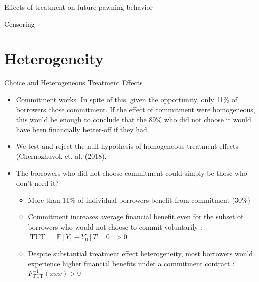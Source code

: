 \documentclass[8pt]{beamer}
\begin{document}
\begin{frame}{Effects of treatment on future pawning behavior}
    
\begin{table}[H]
\caption{Repeat Pawns}
\label{repeat_loans}
\begin{center}
\scriptsize{}
\end{center}

\end{table}    
\end{frame}

\begin{frame}{Censoring}
    \begin{table}[H]
\caption{Bounding censoring}
\label{bounding_censoring}
\begin{center}
\resizebox{0.9\textwidth}{!}{
\scriptsize{}
}
\end{center}
 \scriptsize 
\end{table}
\end{frame}

\section{Heterogeneity}
\begin{frame}{Choice and Heterogeneous Treatment Effects}
\label{choice_hte}
    \begin{itemize}
    \vfill    \item   Commitment works.   In spite of this, given the  opportunity,  only 11\%  of  borrowers  chose  commitment.   If  the  effect  of  commitment  were homogeneous, this would be enough to conclude that the 89\% who did not choose it would have been financially better-off if they had.
    
    \vfill \item We test and reject the null hypothesis of homogeneous treatment effects (Chernozhuvok et. al. (2018).
    
    \vfill \item The borrowers who did not choose commitment could simply be those who don’t need it?
    
    \begin{itemize}
        \item More than 11\% of individual borrowers benefit from commitment (30\%) \hyperlink{fan_park_bounds}{}
        \item Commitment increases average financial benefit even for the subset of borrowers who would not choose to commit voluntarily : $\operatorname{TUT}=\mathbb{E}[Y_1-Y_0\,|\, T=0]>0$
        \item Despite substantial treatment effect heterogeneity, most borrowers would experience higher financial benefits under a commitment contract : $F_{\operatorname{TUT}}^{-1}(xxx)>0$
    \end{itemize}
    \end{itemize}
\end{frame}
\end{document}
